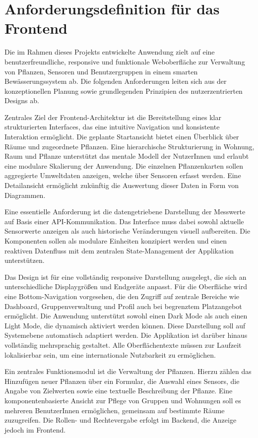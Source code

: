 \section{Anforderungsdefinition für das Frontend}
\label{sec:anforderungen-frontend}

Die im Rahmen dieses Projekts entwickelte Anwendung zielt auf eine benutzerfreundliche, responsive und funktionale Weboberfläche zur Verwaltung von Pflanzen, Sensoren und Benutzergruppen in einem smarten Bewässerungssystem ab. Die folgenden Anforderungen leiten sich aus der konzeptionellen Planung sowie grundlegenden Prinzipien des nutzerzentrierten Designs ab.

Zentrales Ziel der Frontend-Architektur ist die Bereitstellung eines klar strukturierten Interfaces, das eine intuitive Navigation und konsistente Interaktion ermöglicht. Die geplante Startansicht bietet einen Überblick über Räume und zugeordnete Pflanzen. Eine hierarchische Strukturierung in Wohnung, Raum und Pflanze unterstützt das mentale Modell der NutzerInnen und erlaubt eine modulare Skalierung der Anwendung. Die einzelnen Pflanzenkarten sollen aggregierte Umweltdaten anzeigen, welche über Sensoren erfasst werden. Eine Detailansicht ermöglicht zukünftig die Auswertung dieser Daten in Form von Diagrammen.

Eine essentielle Anforderung ist die datengetriebene Darstellung der Messwerte auf Basis einer API-Kommunikation. Das Interface muss dabei sowohl aktuelle Sensorwerte anzeigen als auch historische Veränderungen visuell aufbereiten. Die Komponenten sollen als modulare Einheiten konzipiert werden und einen reaktiven Datenfluss mit dem zentralen State-Management der Applikation unterstützen.

Das Design ist für eine vollständig responsive Darstellung ausgelegt, die sich an unterschiedliche Displaygrößen und Endgeräte anpasst. Für die Oberfläche wird eine Bottom-Navigation vorgesehen, die den Zugriff auf zentrale Bereiche wie Dashboard, Gruppenverwaltung und Profil auch bei begrenztem Platzangebot ermöglicht. Die Anwendung unterstützt sowohl einen Dark Mode als auch einen Light Mode, die dynamisch aktiviert werden können. Diese Darstellung soll auf Systemebene automatisch adaptiert werden. Die Applikation ist darüber hinaus vollständig mehrsprachig gestaltet. Alle Oberflächentexte müssen zur Laufzeit lokalisierbar sein, um eine internationale Nutzbarkeit zu ermöglichen.

Ein zentrales Funktionsmodul ist die Verwaltung der Pflanzen. Hierzu zählen das Hinzufügen neuer Pflanzen über ein Formular, die Auswahl eines Sensors, die Angabe von Zielwerten sowie eine textuelle Beschreibung der Pflanze. Eine komponentenbasierte Ansicht zur Pflege von Gruppen und Wohnungen soll es mehreren BenutzerInnen ermöglichen, gemeinsam auf bestimmte Räume zuzugreifen. Die Rollen- und Rechtevergabe erfolgt im Backend, die Anzeige jedoch im Frontend.

